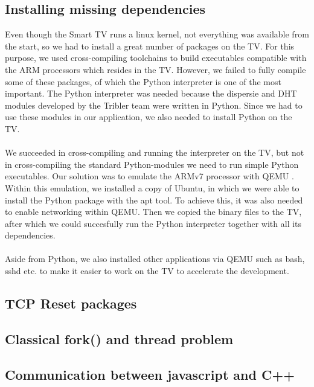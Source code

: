 \subsection{Installing missing dependencies}
Even though the Smart TV runs a linux kernel, not everything was available from the start, so we had to install a great number of packages on the TV.
For this purpose, we used cross-compiling toolchains to build executables compatible with the ARM \cite{arm} processors which resides in the TV. However, we failed
to fully compile some of these packages, of which the Python interpreter is one of the most important. The Python interpreter was needed because the dispersie and DHT modules 
developed by the Tribler team were written in Python. Since we had to use these modules in our application, we also needed to install Python on the TV. 
\\\\
We succeeded in cross-compiling and running the interpreter on the TV, but not in cross-compiling the standard Python-modules we need to run simple Python executables.
Our solution was to emulate the ARMv7 processor with QEMU \cite{qemu}. Within this emulation, we installed a copy of Ubuntu, \cite{ubuntu} in which we were able to install the Python package with the apt tool.
To achieve this, it was also needed to enable networking within QEMU. \cite{qemu-network} Then we copied the binary files to the TV, after which we could succesfully run the Python interpreter together with all its dependencies.
\\\\
Aside from Python, we also installed other applications via QEMU such as bash, sshd etc. to make it easier to work on the TV to accelerate the development.

\subsection{TCP Reset packages}

\subsection{Classical fork() and thread problem}

\subsection{Communication between javascript and C++}

